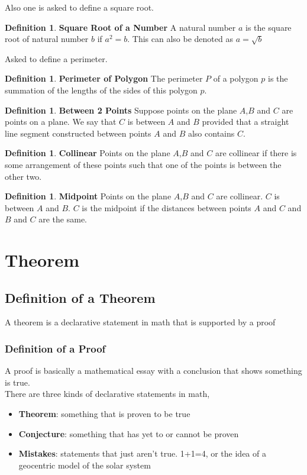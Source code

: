 \documentclass{article}
\theoremstyle{definition}
\theoremstyle{definition}
\newtheorem{dfn}[thm]{Definition}
\begin{document}
Also one is asked to define a square root.
\begin{dfn}\textbf{Square Root of a Number}
   A natural number $a$ is the square root of natural number $b$ if $a^2 = b$. This 
   can also be denoted as $a = \sqrt{b}$
\end{dfn}

Asked to define a perimeter.
\begin{dfn}\textbf{Perimeter of Polygon}
    The perimeter $P$ of a polygon $p$ is the summation of the lengths of the sides of 
    this polygon $p$.
\end{dfn}
\begin{dfn}\textbf{Between 2 Points}
    Suppose points on the plane $A$,$B$ and $C$ are points on a plane. We say that $C$ is between $A$ and
    $B$ provided that a straight line segment constructed between points $A$ and $B$ also contains $C$. 
\end{dfn}

\begin{dfn}\textbf{Collinear}
    Points on the plane $A$,$B$ and $C$ are collinear if there is some arrangement of these points such that 
    one of the points is between the other two.
\end{dfn}
\begin{dfn}\textbf{Midpoint}
    Points on the plane $A$,$B$ and $C$ are collinear. $C$ is between $A$ and $B$. $C$ is the midpoint
    if the distances between points $A$ and $C$ and $B$ and $C$ are the same.
\end{dfn}
\setcounter{section}{4}
\setcounter{thm}{0}
\pagebreak
\section*{Theorem}
\subsection*{Definition of a Theorem}
A theorem is a declarative statement in math that is 
supported by a proof
\subsubsection*{Definition of a Proof}
A proof is basically a mathematical essay with a conclusion
that shows something is true.
\\[\baselineskip]
There are three kinds of declarative statements in math,
\begin{itemize}
    \item{\textbf{Theorem}: something that is proven to be true}
    \item{\textbf{Conjecture}: something that has yet to or cannot be proven}
    \item{\textbf{Mistakes}: statements that just aren't true. 1+1=4, or the idea
        of a geocentric model of the solar system}
\end{itemize}
\end{document}
